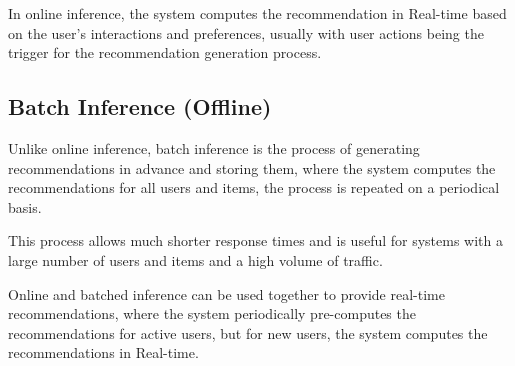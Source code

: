In online inference, the system computes the recommendation in Real-time based on the user's interactions and preferences, usually with user actions being the trigger for the recommendation generation process.

\subsection{Batch Inference (Offline)}
Unlike online inference, batch inference is the process of generating recommendations in advance and storing them, 
where the system computes the recommendations for all users and items, 
the process is repeated on a periodical basis.\cite{NvidiaOfflineToOnline}

This process allows much shorter response times and is useful for systems with a large number of users and items and a high volume of traffic.

Online and batched inference can be used together to provide real-time recommendations, where the system periodically pre-computes the recommendations for active users, but for new users, the system computes the recommendations in Real-time.